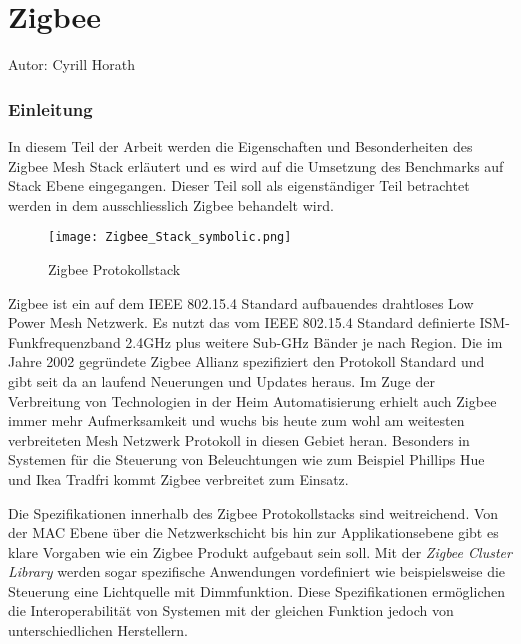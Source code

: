 \vspace*{4cm}
\part{Zigbee}\label{part:Zigbee}
Autor: Cyrill Horath
\vspace*{\fill}
\clearpage

\section{Einleitung}\label{sec:EinleitungZigbee}
In diesem Teil der Arbeit werden die Eigenschaften und Besonderheiten des Zigbee Mesh Stack erläutert und es wird auf die Umsetzung des Benchmarks auf Stack Ebene eingegangen. Dieser Teil soll als eigenständiger Teil betrachtet werden in dem ausschliesslich Zigbee behandelt wird.

\begin{wrapfigure}{r}{0.5\textwidth}
	\centering
	\texttt{[image: Zigbee\_Stack\_symbolic.png]}
	\caption{Zigbee Protokollstack}	\label{fig:ZigbeeProtokollstack}
\end{wrapfigure}

Zigbee ist ein auf dem IEEE 802.15.4 Standard aufbauendes drahtloses Low Power Mesh Netzwerk. Es nutzt das vom IEEE 802.15.4 Standard definierte ISM-Funkfrequenzband 2.4GHz plus weitere Sub-GHz Bänder je nach Region.
Die im Jahre 2002 gegründete Zigbee Allianz spezifiziert den Protokoll Standard und gibt seit da an laufend Neuerungen und Updates heraus.
Im Zuge der Verbreitung von Technologien in der Heim Automatisierung erhielt auch Zigbee immer mehr Aufmerksamkeit und wuchs bis heute zum wohl am weitesten verbreiteten Mesh Netzwerk Protokoll in diesen Gebiet heran. Besonders in Systemen für die Steuerung von Beleuchtungen wie zum Beispiel Phillips Hue und Ikea Tradfri kommt Zigbee verbreitet zum Einsatz.

Die Spezifikationen innerhalb des Zigbee Protokollstacks sind weitreichend. Von der MAC Ebene über die Netzwerkschicht bis hin zur Applikationsebene gibt es klare Vorgaben wie ein Zigbee Produkt aufgebaut sein soll.
Mit der \textit{Zigbee Cluster Library} werden sogar spezifische Anwendungen vordefiniert wie beispielsweise die Steuerung eine Lichtquelle mit Dimmfunktion.
Diese Spezifikationen ermöglichen die Interoperabilität von Systemen mit der gleichen Funktion jedoch von unterschiedlichen Herstellern.






